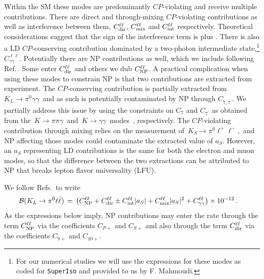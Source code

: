 \documentclass[amsmath,amssymb,aps,nofootinbib,prd,preprint,superscriptaddress,tightenlines,a4paper,bm]{revtex4-2}
\begin{document}
Within the SM these modes are predominantly $CP$-violating and receive multiple contributions.
There are direct and through-mixing $CP$-violating contributions as well as interference between them,  $C_{\rm dir}^{\ell\ell}$, $C_{\rm mix}^{\ell\ell}$ and $C_{\rm int}^{\ell\ell}$ respectively.
Theoretical considerations suggest that the sign of the interference term is plus \cite{Buchalla:2003sj}.
There is also a LD $CP$-conserving contribution dominated by a two-photon intermediate state,\footnote{For our numerical studies we will use the expressions for these modes as coded for {\tt SuperIso} and provided to us by F. Mahmoudi.\medskip} $C_{\gamma \gamma}^{\ell\ell}$.
Potentially there are NP contributions as well, which we include following Ref.\,\cite{Mescia:2006jd}.
Some enter $C_{\rm dir}^{\ell\ell}$ and others we dub $C_{\rm NP}^{\ell\ell}$.
A practical complication when using these modes to constrain NP is that two contributions are extracted from experiment.
The $CP$-conserving contribution is partially extracted from \,$K_L\to \pi^0\gamma\gamma$\, and as such is potentially contaminated by NP through $C_{7,7^\prime}$.
We partially address this issue by using the constraints on $C_7$ and $C_{7^\prime}$ as obtained from the \,$K\to \pi \pi \gamma$\, and \,$K\to \gamma\gamma$\, modes~\cite{Mertens:2011ts}, respectively.
The $CP$-violating contribution through mixing relies on the measurement of \,$K_S\to \pi^0\ell^+\ell^-$,\, and NP affecting those modes could contaminate the extracted value of $a_S$.
However, an $a_S$ representing LD contributions is the same for both the electron and muon modes, so that the difference between the two extractions can be attributed to NP that breaks lepton flavor universality (LFU).

We follow Refs.\,\cite{Buchalla:2003sj,Isidori:2004rb,Mescia:2006jd,DAmbrosio:2022kvb} to write
\begin{align}
{\cal B}(K_L \to \pi^0 \ell \bar{\ell}) & \,=\, \big( C_{\rm NP}^{\ell\ell}+C_{\rm dir}^{\ell\ell} \pm C_{\rm int}^{\ell\ell}|a_S| + C_{\rm mix}^{\ell\ell}|a_S|^2 + C_{\gamma \gamma}^{\ell\ell}  \big)\times 10^{-12} \,. &
\label{eq:klpill}
\end{align}
As the expressions below imply, NP contributions may enter the rate through the term $C^{\ell\ell}_{\rm NP}$ via the coefficients $C_{P+}$ and $C_{S+}$ and also through the term $C^{\ell\ell}_{\rm dir}$ via the coefficients $C_{9+}$ and $C_{10+}$.
\end{document}
